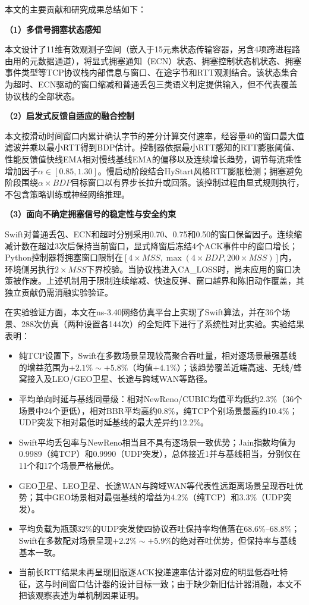 本文的主要贡献和研究成果总结如下：

\textbf{（1）多信号拥塞状态感知}

本文设计了11维有效观测子空间（嵌入于15元素状态传输容器，另含4项跨进程路由用的元数据通道），将显式拥塞通知（ECN）状态、拥塞控制状态机状态、拥塞事件类型等TCP协议栈内部信息与窗口、在途字节和RTT观测结合。该状态集合为超时、ECN驱动的窗口缩减和普通丢包三类语义判定提供输入，但不代表覆盖协议栈的全部状态。

\textbf{（2）启发式反馈自适应的融合控制}

本文按滑动时间窗口内累计确认字节的差分计算交付速率，经容量40的窗口最大值滤波并乘以最小RTT得到BDP估计。控制器依据最小RTT感知的RTT膨胀阈值、性能反馈值快线EMA相对慢线基线EMA的偏移以及连续增长趋势，调节每流乘性增加因子$\alpha\in[0.85,1.30]$。慢启动阶段结合HyStart风格RTT膨胀检测；拥塞避免阶段围绕$\alpha\times BDP$目标窗口以有界步长拉升或回落。该控制过程由显式规则执行，不包含策略训练或神经网络推理。

\textbf{（3）面向不确定拥塞信号的稳定性与安全约束}

Swift对普通丢包、ECN和超时分别采用0.70、0.75和0.50的窗口保留因子。连续缩减计数在超过3次后保持当前窗口，显式降窗后冻结4个ACK事件中的窗口增长；Python控制器将拥塞窗口限制在$[4\times MSS,\max(4\times BDP,200\times MSS)]$内，环境侧另执行$2\times MSS$下界校验。当协议栈进入CA\_LOSS时，尚未应用的窗口决策被作废。上述机制用于限制连续缩减、快速反弹、窗口越界和陈旧动作覆盖，其独立贡献仍需消融实验验证。

在实验验证方面，本文在ns-3.40网络仿真平台上实现了Swift算法，并在36个场景、288次仿真（两种设置各144次）的全矩阵下进行了系统性对比实验。实验结果表明：

\begin{itemize}
    \item 纯TCP设置下，Swift在多数场景呈现较高聚合吞吐量，相对逐场景最强基线的增益范围为$+2.1\%\sim+5.8\%$（均值$+4.1\%$）；该趋势覆盖近端高速、无线/蜂窝接入及LEO/GEO卫星、长途与跨域WAN等路径。
    \item 平均单向时延与基线同量级：相对NewReno/CUBIC均值平均低约2.3\%（36个场景中24个更低），相对BBR平均高约0.8\%，纯TCP个别场景最高约10.4\%；UDP突发下相对最低时延基线的最大差异约12.2\%。
    \item Swift平均丢包率与NewReno相当且不具有逐场景一致优势；Jain指数均值为0.9989（纯TCP）和0.9990（UDP突发），总体接近1并与基线相当，分别仅在11个和17个场景严格最优。
    \item GEO卫星、LEO卫星、长途WAN与跨域WAN等代表性远距离场景呈现吞吐优势；其中GEO场景相对最强基线的增益为4.2\%（纯TCP）和3.3\%（UDP突发）。
    \item 平均负载为瓶颈32\%的UDP突发使四协议吞吐保持率均值落在68.6\%--68.8\%；Swift在多数配对场景呈现$+2.2\%\sim+5.9\%$的绝对吞吐优势，但保持率与基线基本一致。
    \item 当前长RTT结果未再呈现旧版逐ACK投递速率估计器对应的明显低吞吐特征，这与时间窗口估计器的设计目标一致；由于缺少新旧估计器消融，本文不把该观察表述为单机制因果证明。
\end{itemize}

